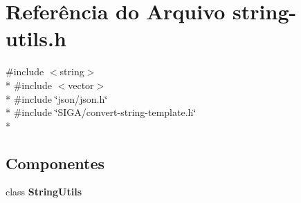 \section{Referência do Arquivo string-\/utils.h}
\label{string-utils_8h}
{\ttfamily \#include $<$string$>$}\\*
{\ttfamily \#include $<$vector$>$}\\*
{\ttfamily \#include \char`\"{}json/json.\+h\char`\"{}}\\*
{\ttfamily \#include \char`\"{}S\+I\+G\+A/convert-\/string-\/template.\+h\char`\"{}}\\*
\subsection*{Componentes}
\begin{DoxyCompactItemize}
\item 
class {\bf String\+Utils}
\end{DoxyCompactItemize}
